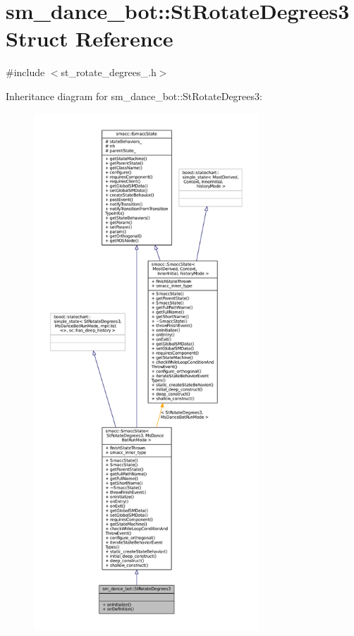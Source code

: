 \hypertarget{structsm__dance__bot_1_1StRotateDegrees3}{}\section{sm\+\_\+dance\+\_\+bot\+:\+:St\+Rotate\+Degrees3 Struct Reference}
\label{structsm__dance__bot_1_1StRotateDegrees3}


{\ttfamily \#include $<$st\+\_\+rotate\+\_\+degrees\+\_.\+h$>$}



Inheritance diagram for sm\+\_\+dance\+\_\+bot\+:\+:St\+Rotate\+Degrees3\+:
\nopagebreak
\begin{figure}[H]
\begin{center}
\leavevmode
\includegraphics[height=550pt]{structsm__dance__bot_1_1StRotateDegrees3__inherit__graph}
\end{center}
\end{figure}


